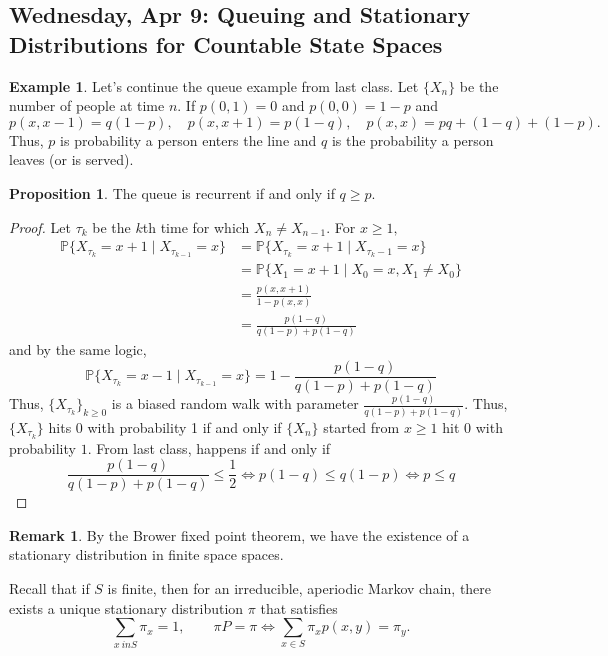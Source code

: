 \documentclass[10pt, oneside]{article}
\newcommand{\bbP}{\mathbb{P}}
\theoremstyle{definition}
\newtheorem{exmp}{Example}[section]
\newtheorem{prop}{Proposition}
\newtheorem{rem}{Remark}
\begin{document}
\subsection{Wednesday, Apr 9: Queuing and Stationary Distributions for Countable State Spaces}
\begin{exmp}
    Let's continue the queue example from last class. Let $\{X_n\}$ be the number of people at time $n.$ If $p(0,1) = 0$ and $p(0,0) = 1-p$ and
    \[p(x,x-1) = q(1-p), \quad p(x,x+1) = p(1-q), \quad p(x,x) = pq + (1-q) + (1-p).\] Thus, $p$ is probability a person enters the line and $q$ is the probability a person leaves (or is served). 
    \begin{prop}
        The queue is recurrent if and only if $q \geq p.$ 
    \end{prop}
    \begin{proof}
        Let $\tau_k$ be the $k$th time for which $X_n \neq X_{n-1}.$ For $x \geq 1,$ 
        \begin{align*}
        \bbP\{X_{\tau_k} = x + 1 \mid X_{\tau_{k-1}}= x\} &= \bbP\{X_{\tau_k} = x + 1 \mid X_{\tau_k -1} = x\}\\ &= \bbP\{X_1 = x + 1 \mid X_0 = x, X_1 \neq X_0\}\\ &= \frac{p(x,x+1)}{1 - p(x,x)}\\ &= \frac{p(1-q)}{q(1-p) + p(1-q)}    
        \end{align*}
        and by the same logic, 
        \[\bbP\{X_{\tau_k} = x-1 \mid X_{\tau_{k-1}} = x\} = 1- \frac{p(1-q)}{q(1-p) + p(1-q)}\]
        Thus, $\{X_{\tau_k}\}_{k\geq 0}$ is a biased random walk with parameter $\frac{p(1-q)}{q(1-p) + p(1-q)}.$ Thus, $\{X_{\tau_k}\}$ hits $0$ with probability 1 if and only if $\{X_n\}$ started from $x\geq 1$ hit $0$ with probability $1.$ From last class, happens if and only if 
        \[\frac{p(1-q)}{q(1-p) + p(1-q)} \leq \frac{1}{2} \iff p(1-q) \leq q(1-p) \iff p \leq q\]
    \end{proof}
\end{exmp}

\begin{rem}
    By the Brower fixed point theorem, we have the existence of a stationary distribution in finite space spaces. 
\end{rem}

Recall that if $S$ is finite, then for an irreducible, aperiodic Markov chain, there exists a unique stationary distribution $\pi$ that satisfies 
\[\sum_{x\ in S} \pi_x = 1 , \qquad \pi P = \pi \iff \sum_{x\in S} \pi_x p(x,y) = \pi_y.\]
\end{document}
